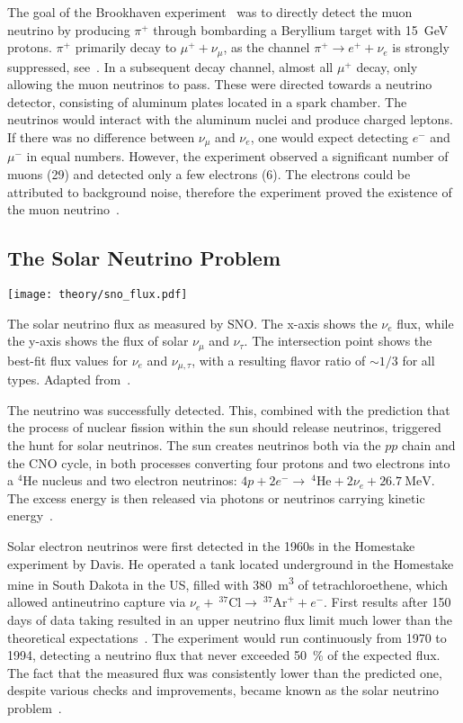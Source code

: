The goal of the Brookhaven experiment~ was to directly detect the muon neutrino by producing $\pi^+$ through bombarding a Beryllium target with \SI{15}{\giga\eV} protons. $\pi^+$ primarily decay to $\mu^+ + \nu_\mu$, as the channel $\pi^+ \rightarrow e^+ + \nu_e$ is strongly suppressed, see~\cite{Bilenky2012}. In a subsequent decay channel, almost all $\mu^+$ decay, only allowing the muon neutrinos to pass. These were directed towards a neutrino detector, consisting of aluminum plates located in a spark chamber. The neutrinos would interact with the aluminum nuclei and produce charged leptons. If there was no difference between $\nu_\mu$ and $\nu_e$, one would expect detecting $e^-$ and $\mu^-$ in equal numbers. However, the experiment observed a significant number of muons (29) and detected only a few electrons (6). The electrons could be attributed to background noise, therefore the experiment proved the existence of the muon neutrino~\cite{Danby1962}.

\subsection{The Solar Neutrino Problem}

\begin{marginfigure}
  \texttt{[image: theory/sno\_flux.pdf]}
  \caption[Solar neutrino flux measured by SNO]{The solar neutrino flux as measured by SNO\@. The x-axis shows the $\nu_e$ flux, while the y-axis shows the flux of solar $\nu_\mu$ and $\nu_\tau$. The intersection point shows the best-fit flux values for $\nu_e$ and $\nu_{\mu,\tau}$, with a resulting flavor ratio of $\sim1/3$ for all types. Adapted from~\cite{Ahmad2002}.}
\end{marginfigure}

The neutrino was successfully detected. This, combined with the prediction that the process of nuclear fission within the sun should release neutrinos, triggered the hunt for solar neutrinos. The sun creates neutrinos both via the $pp$ chain and the CNO cycle, in both processes converting four protons and two electrons into a $^4\text{He}$ nucleus and two electron neutrinos: $4p + 2e^- \rightarrow  ~^4\text{He} + 2\nu_e + \SI{26.7}{\mega\eV}$. The excess energy is then released via photons or neutrinos carrying kinetic energy~\cite{Giunti2007}.

Solar electron neutrinos were first detected in the 1960s in the Homestake experiment by Davis. He operated a tank located underground in the Homestake mine in South Dakota in the US, filled with \SI{380}{\meter\cubed} of tetrachloroethene, which allowed antineutrino capture via $\nu_e +~ ^{37}\text{Cl} \rightarrow ~ ^{37}\text{Ar}^+ + e^-$. First results after 150 days of data taking resulted in an upper neutrino flux limit much lower than the theoretical expectations~. The experiment would run continuously from 1970 to 1994, detecting a neutrino flux that never exceeded \SI{50}{\percent} of the expected flux. The fact that the measured flux was consistently lower than the predicted one, despite various checks and improvements, became known as the solar neutrino problem~.

